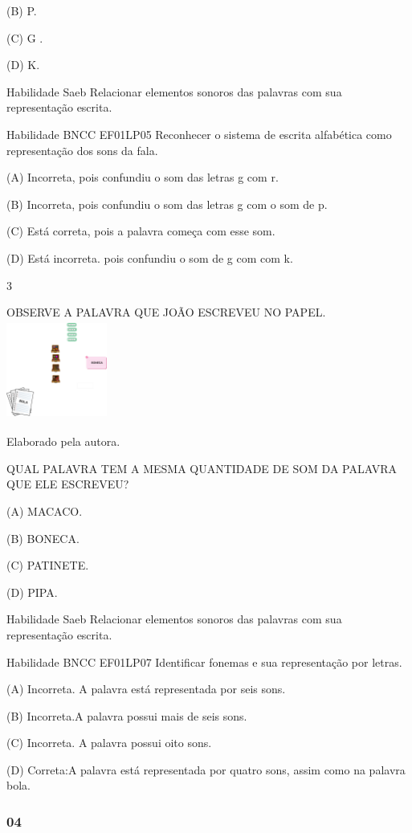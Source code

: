 \begin{escola}
(B) P.

(C) G .

(D) K.

Habilidade Saeb Relacionar elementos sonoros das palavras com sua
representação escrita.

Habilidade BNCC EF01LP05 Reconhecer o sistema de escrita alfabética como
representação dos sons da fala.

(A) Incorreta, pois confundiu o som das letras g com r.

(B) Incorreta, pois confundiu o som das letras g com o som de p.

(C) Está correta, pois a palavra começa com esse som.

(D) Está incorreta. pois confundiu o som de g com com k.

\num{3}

OBSERVE A PALAVRA QUE JOÃO ESCREVEU NO
PAPEL.\includegraphics[width=1.29792in,height=1.27986in]{media/image188.png}

Elaborado pela autora.

QUAL PALAVRA TEM A MESMA QUANTIDADE DE SOM DA PALAVRA QUE ELE ESCREVEU?

(A) MACACO.

(B) BONECA.

(C) PATINETE.

(D) PIPA.

Habilidade Saeb Relacionar elementos sonoros das palavras com sua
representação escrita.

Habilidade BNCC EF01LP07 Identificar fonemas e sua representação por
letras.

(A) Incorreta. A palavra está representada por seis sons.

(B) Incorreta.A palavra possui mais de seis sons.

(C) Incorreta. A palavra possui oito sons.

(D) Correta:A palavra está representada por quatro sons, assim como na
palavra bola.

\subsubsection{04}\label{section-29}


\end{escola}
